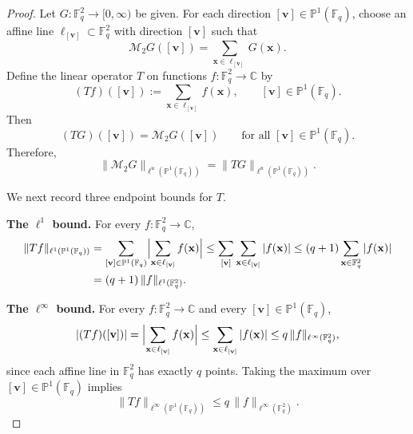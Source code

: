 \documentclass[10pt,a4paper]{amsart}
\begin{document}
 \begin{proof}
Let $G:\mathbb{F}_q^2\to[0,\infty)$ be given.
For each direction $[\mathbf{v}]\in\mathbb{P}^1(\mathbb{F}_q)$, choose an affine line
$\ell_{[\mathbf{v}]}\subset\mathbb{F}_q^2$ with direction $[\mathbf{v}]$ such that
\[
\mathcal{M}_{2}G([\mathbf{v}])=\sum_{\mathbf{x} \in \ell_{[\mathbf{v}]}} G(\mathbf{x}).
\]
Define the linear operator $T$ on functions $f:\mathbb{F}_q^2\to\mathbb{C}$ by
\[
(T f)([\mathbf{v}]):=\sum_{\mathbf{x} \in\ell_{[\mathbf{v}]}} f(\mathbf{x}),
\qquad [\mathbf{v}]\in\mathbb{P}^1(\mathbb{F}_q).
\]
Then
\begin{equation}\label{eq:TG-linearizes}
(T G)([\mathbf{v}])=\mathcal{M}_{2}G([\mathbf{v}])
\qquad\text{for all }[\mathbf{v}]\in\mathbb{P}^1(\mathbb{F}_q).
\end{equation}
Therefore,
\begin{equation}\label{eq:reduce-to-TG}
\|\mathcal{M}_{2}G\|_{\ell^u(\mathbb{P}^1(\mathbb{F}_q))}
=
\|T G\|_{\ell^u(\mathbb{P}^1(\mathbb{F}_q))}.
\end{equation}

We next record three endpoint bounds for $T$.


\medskip
\noindent\textbf{The $\ell^1$ bound.}
For every $f:\mathbb{F}_q^2\to\mathbb{C}$,
\begin{align}\label{eq:TG-l1}
\|T f\|_{\ell^1(\mathbb{P}^1(\mathbb{F}_q))}
&=
\sum_{[\mathbf{v}]\in\mathbb{P}^1(\mathbb{F}_q)}
\Bigl|\sum_{\mathbf{x} \in\ell_{[\mathbf{v}]}} f(\mathbf{x})\Bigr|
\le
\sum_{[\mathbf{v}]}\sum_{\mathbf{x} \in\ell_{[\mathbf{v}]}}|f(\mathbf{x})|
\le
(q+1)\sum_{\mathbf{x} \in\mathbb{F}_q^2}|f(\mathbf{x})| \notag\\
&=
(q+1)\,\|f\|_{\ell^1(\mathbb{F}_q^2)}.
\end{align}

\medskip
\noindent\textbf{The $\ell^\infty$ bound.}
For every $f:\mathbb{F}_q^2\to\mathbb{C}$ and every $[\mathbf{v}]\in \mathbb{P}^1(\mathbb{F}_q)$,
\[
|(T f)([\mathbf{v}])|
=
\Bigl|\sum_{\mathbf{x} \in\ell_{[\mathbf{v}]}} f(\mathbf{x})\Bigr|
\le
\sum_{\mathbf{x} \in\ell_{[\mathbf{v}]}}|f(\mathbf{x})|
\le
q\,\|f\|_{\ell^\infty(\mathbb{F}_q^2)},
\]
since each affine line in $\mathbb{F}_q^2$ has exactly $q$ points.
Taking the maximum over $[\mathbf{v}]\in \mathbb{P}^1(\mathbb{F}_q)$ implies
\begin{equation}\label{eq:TG-linfty}
\|T f\|_{\ell^\infty(\mathbb{P}^1(\mathbb{F}_q))}
\le
q\,\|f\|_{\ell^\infty(\mathbb{F}_q^2)}.
\end{equation}


\end{proof}
\end{document}
